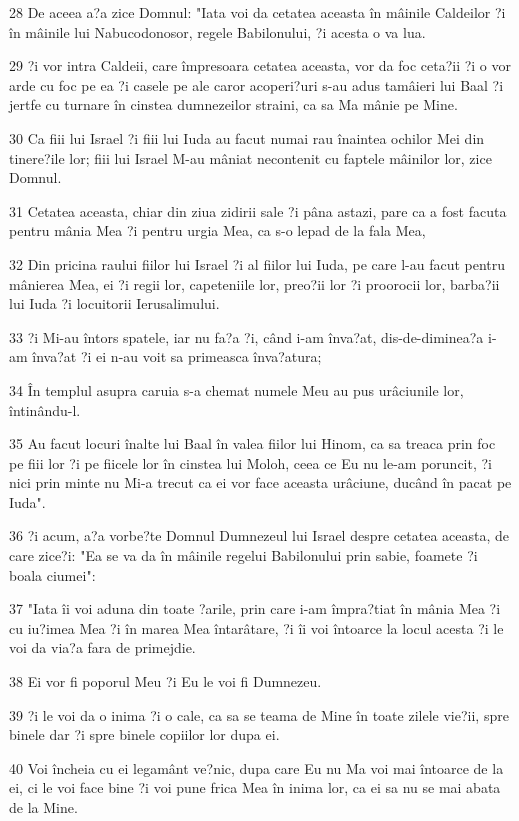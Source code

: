 \par 28 De aceea a?a zice Domnul: "Iata voi da cetatea aceasta în mâinile Caldeilor ?i în mâinile lui Nabucodonosor, regele Babilonului, ?i acesta o va lua.
\par 29 ?i vor intra Caldeii, care împresoara cetatea aceasta, vor da foc ceta?ii ?i o vor arde cu foc pe ea ?i casele pe ale caror acoperi?uri s-au adus tamâieri lui Baal ?i jertfe cu turnare în cinstea dumnezeilor straini, ca sa Ma mânie pe Mine.
\par 30 Ca fiii lui Israel ?i fiii lui Iuda au facut numai rau înaintea ochilor Mei din tinere?ile lor; fiii lui Israel M-au mâniat necontenit cu faptele mâinilor lor, zice Domnul.
\par 31 Cetatea aceasta, chiar din ziua zidirii sale ?i pâna astazi, pare ca a fost facuta pentru mânia Mea ?i pentru urgia Mea, ca s-o lepad de la fala Mea,
\par 32 Din pricina raului fiilor lui Israel ?i al fiilor lui Iuda, pe care l-au facut pentru mânierea Mea, ei ?i regii lor, capeteniile lor, preo?ii lor ?i proorocii lor, barba?ii lui Iuda ?i locuitorii Ierusalimului.
\par 33 ?i Mi-au întors spatele, iar nu fa?a ?i, când i-am înva?at, dis-de-diminea?a i-am înva?at ?i ei n-au voit sa primeasca înva?atura;
\par 34 În templul asupra caruia s-a chemat numele Meu au pus urâciunile lor, întinându-l.
\par 35 Au facut locuri înalte lui Baal în valea fiilor lui Hinom, ca sa treaca prin foc pe fiii lor ?i pe fiicele lor în cinstea lui Moloh, ceea ce Eu nu le-am poruncit, ?i nici prin minte nu Mi-a trecut ca ei vor face aceasta urâciune, ducând în pacat pe Iuda".
\par 36 ?i acum, a?a vorbe?te Domnul Dumnezeul lui Israel despre cetatea aceasta, de care zice?i: "Ea se va da în mâinile regelui Babilonului prin sabie, foamete ?i boala ciumei":
\par 37 "Iata îi voi aduna din toate ?arile, prin care i-am împra?tiat în mânia Mea ?i cu iu?imea Mea ?i în marea Mea întarâtare, ?i îi voi întoarce la locul acesta ?i le voi da via?a fara de primejdie.
\par 38 Ei vor fi poporul Meu ?i Eu le voi fi Dumnezeu.
\par 39 ?i le voi da o inima ?i o cale, ca sa se teama de Mine în toate zilele vie?ii, spre binele dar ?i spre binele copiilor lor dupa ei.
\par 40 Voi încheia cu ei legamânt ve?nic, dupa care Eu nu Ma voi mai întoarce de la ei, ci le voi face bine ?i voi pune frica Mea în inima lor, ca ei sa nu se mai abata de la Mine.
